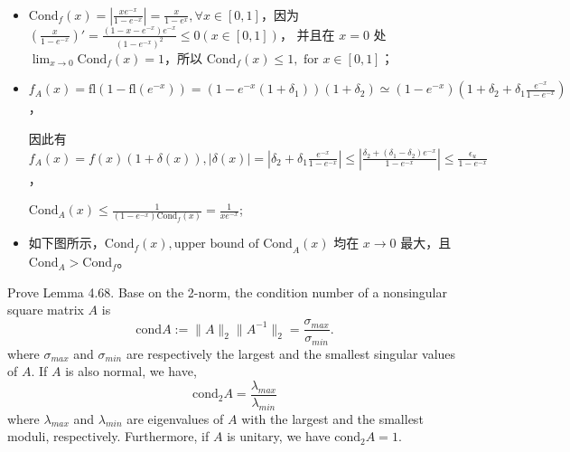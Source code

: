 \documentclass[lang=cn,a4paper,newtx,bibend=bibtex]{elegantpaper}
\begin{document}
\begin{solution} ~~%

  \begin{itemize}
    \item $\text{Cond}_f(x) = \left|\frac{xe^{-x}}{1-e^{-x}}\right|  = \frac{x}{1 - e^x}, \forall x \in [0, 1]$，因为 $(\frac{x}{1-e^{-x}})' = \frac{(1 - x - e^{-x})e^{-x}}{(1- e^{-x})^2}\le 0 (x \in [0, 1])$，
          并且在 $x = 0$ 处 $\lim_{x\to 0} \text{Cond}_f(x) = 1$，所以 $\text{Cond}_f (x) \le 1, \text{ for } x\in [0, 1]$；
    \item $f_A(x) = \text{fl}(1 - \text{fl}(e^{-x})) = (1 - e^{-x}(1 + \delta_1))(1 + \delta_2) \simeq (1 - e^{-x})(1 + \delta_2 + \delta_1\frac{e^{-x}}{1 - e^{-x}})$，
   
    因此有 $f_A(x) = f(x)(1 + \delta(x)), |\delta(x)| = \left|\delta_2 + \delta_1\frac{e^{-x}}{1 - e^{-x}}\right|\le |\frac{\delta_2 + (\delta_1 - \delta_2)e^{-x}}{1 - e^{-x}}| \le \frac{\epsilon_u}{1 - e^{-x}}$，
    
    $\text{Cond}_A(x) \le \frac{1}{(1- e^{-x})\text{Cond}_f(x)} = \frac1{xe^{-x}}$;
    \item 如下图所示，$\text{Cond}_f(x), \text{upper bound of Cond}_A(x)$ 均在 $x\to 0$ 最大，且 $\text{Cond}_A > \text{Cond}_f$。
    \begin{center}
  \end{center}
  \end{itemize}
\end{solution}

\begin{prob}[4.4.1-\textrm{X}.]
  Prove Lemma 4.68. Base on the 2-norm, the condition number of a nonsingular square
  matrix $A$ is
  \[\text{cond} A := \|A\|_2\|A^{-1}\|_2 = \dfrac{\sigma_{max}}{\sigma_{min}}.\]
  where $\sigma_{max}$ and $\sigma_{min}$ are respectively the largest and the
  smallest singular values of $A$. If $A$ is also normal, we have, 
  \[\text{cond}_2 A = \dfrac{\lambda_{max}}{\lambda_{min}}\]
  where $\lambda_{max}$ and $\lambda_{min}$ are eigenvalues of $A$ with the largest
  and the smallest moduli, respectively. Furthermore, if $A$ is unitary, we have 
  $\text{cond}_2 A = 1$.
\end{prob}
\end{document}
